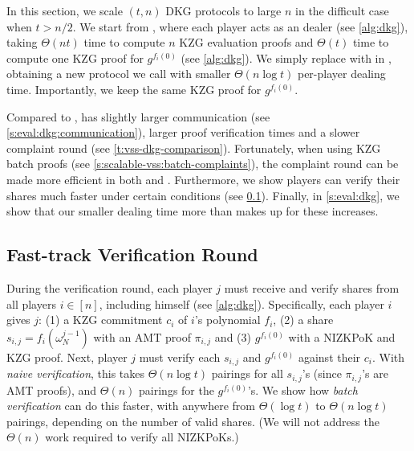 In this section, we scale $(t,n)$ DKG protocols to large $n$ in the difficult case when $t > n/2$.
We start from \ejfdkg, where each player acts as an \evss dealer (see \cref{alg:dkg}), taking $\Theta(nt)$ time to compute $n$ KZG evaluation proofs and $\Theta(t)$ time to compute one KZG proof for $g^{f_i(0)}$ (see \cref{alg:dkg}).
We simply replace \evss with \ourvss in \ejfdkg, obtaining a new protocol we call \ourdkg with smaller $\Theta(n\log{t})$ per-player dealing time.
Importantly, we keep the same KZG proof for $g^{f_i(0)}$.

Compared to \ejfdkg, \ourdkg has slightly larger communication (see \cref{s:eval:dkg:communication}), larger proof verification times and a slower complaint round (see \cref{t:vss-dkg-comparison}).
Fortunately, when using KZG batch proofs (see \cref{s:scalable-vss:batch-complaints}), the complaint round can be made more efficient in both \ejfdkg and \ourdkg.
Furthermore, we show \ourdkg players can verify their shares much faster under certain conditions (see \cref{s:scalable-dkg:share-verif}).
Finally, in \cref{s:eval:dkg}, we show that our smaller dealing time more than makes up for these increases.

\subsection{Fast-track Verification Round}
\label{s:scalable-dkg:share-verif}
During the verification round, each player $j$ must receive and verify shares from all players $i\in[n]$, including himself (see \cref{alg:dkg}).
Specifically, each player $i$ gives $j$: (1) a KZG commitment $c_i$ of $i$'s polynomial $f_i$, (2) a share $s_{i,j}=f_i(\omega_N^{j-1})$ with an AMT proof $\pi_{i,j}$ and (3) $g^{f_i(0)}$ with a NIZKPoK and KZG proof.
Next, player $j$ must verify each $s_{i,j}$ and $g^{f_i(0)}$ against their $c_i$.
With \textit{naive verification}, this takes $\Theta(n\log{t})$ pairings for all $s_{i,j}$'s (since $\pi_{i,j}$'s are AMT proofs), and $\Theta(n)$ pairings for the $g^{f_i(0)}$'s.
We show how \textit{batch verification} can do this faster, with anywhere from $\Theta(\log{t})$ to $\Theta(n\log{t})$ pairings, depending on the number of valid shares.
(We will not address the $\Theta(n)$ work required to verify all NIZKPoKs.)

